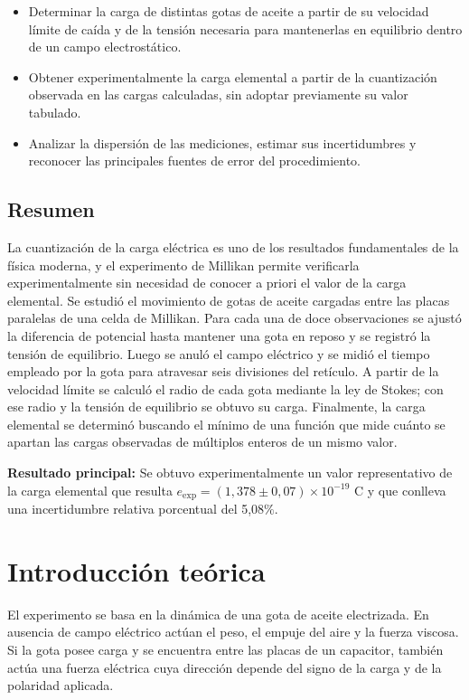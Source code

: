 \documentclass{article}
\begin{document}
\begin{itemize}
    \item Determinar la carga de distintas gotas de aceite a partir de su velocidad límite de caída y de la tensión necesaria para mantenerlas en equilibrio dentro de un campo electrostático.
    \item Obtener experimentalmente la carga elemental a partir de la cuantización observada en las cargas calculadas, sin adoptar previamente su valor tabulado.
    \item Analizar la dispersión de las mediciones, estimar sus incertidumbres y reconocer las principales fuentes de error del procedimiento.
\end{itemize}

\subsection{Resumen}

La cuantización de la carga eléctrica es uno de los resultados fundamentales de la física moderna, y el experimento de Millikan permite verificarla experimentalmente sin necesidad de conocer a priori el valor de la carga elemental. Se estudió el movimiento de gotas de aceite cargadas entre las placas paralelas de una celda de Millikan. Para cada una de doce observaciones se ajustó la diferencia de potencial hasta mantener una gota en reposo y se registró la tensión de equilibrio. Luego se anuló el campo eléctrico y se midió el tiempo empleado por la gota para atravesar seis divisiones del retículo. A partir de la velocidad límite se calculó el radio de cada gota mediante la ley de Stokes; con ese radio y la tensión de equilibrio se obtuvo su carga. Finalmente, la carga elemental se determinó buscando el mínimo de una función que mide cuánto se apartan las cargas observadas de múltiplos enteros de un mismo valor.

\textbf{Resultado principal:} Se obtuvo experimentalmente un valor representativo de la carga elemental que resulta $e_{\mathrm{exp}} = (1,378 \pm 0,07) \times 10^{-19}$ C y que conlleva una incertidumbre relativa porcentual del 5,08$\%$.

\section{Introducción teórica}

El experimento se basa en la dinámica de una gota de aceite electrizada. En ausencia de campo eléctrico actúan el peso, el empuje del aire y la fuerza viscosa. Si la gota posee carga y se encuentra entre las placas de un capacitor, también actúa una fuerza eléctrica cuya dirección depende del signo de la carga y de la polaridad aplicada.
\end{document}
